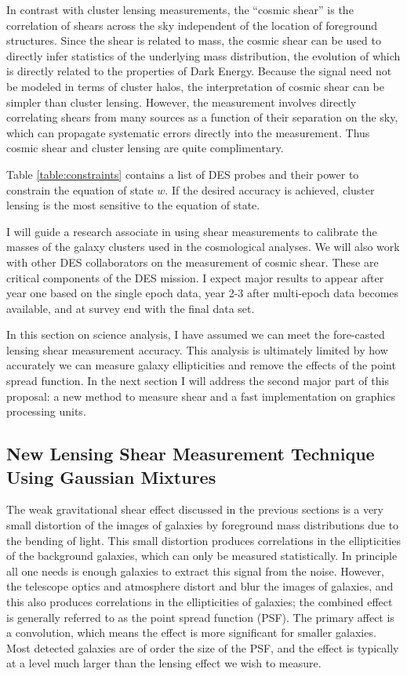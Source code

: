 \documentclass[12pt]{article}
\begin{document}
In contrast with cluster lensing measurements, the ``cosmic shear'' is the
correlation of shears across the sky independent of the location of foreground
structures.  Since the shear is related to mass, the cosmic shear can be used
to directly infer statistics of the underlying mass distribution, the evolution
of which is directly related to the properties of Dark Energy.  Because the
signal need not be modeled in terms of cluster halos, the interpretation of
cosmic shear can be simpler than cluster lensing.  However, the measurement
involves directly correlating shears from many sources as a function of their
separation on the sky, which can propagate systematic errors directly into the
measurement. Thus cosmic shear and cluster lensing are quite complimentary.

Table \ref{table:constraints} contains a list of DES probes and their power to
constrain the equation of state $w$.  If the desired accuracy is achieved,
cluster lensing is the most sensitive to the equation of state.

I will guide a research associate in using shear measurements to calibrate the
masses of the galaxy clusters used in the cosmological analyses.  We will also
work with other DES collaborators on the measurement of cosmic shear.  These
are critical components of the DES mission.   I expect major results to appear
after year one based on the single epoch data, year 2-3 after multi-epoch data
becomes available, and at survey end with the final data set.

In this section on science analysis, I have assumed we can meet the fore-casted
lensing shear measurement accuracy.  This analysis is ultimately limited by how
accurately we can measure galaxy ellipticities and remove the effects of the
point spread function.  In the next section I will address the second major
part of this proposal: a new method to measure shear and a fast implementation
on graphics processing units.

\subsection{New Lensing Shear Measurement Technique Using Gaussian Mixtures}
\label{sec:gmix}

The weak gravitational shear effect discussed in the previous sections is a
very small distortion of the images of galaxies by foreground mass
distributions due to the bending of light.  This small distortion produces
correlations in the ellipticities of the background galaxies, which can only be
measured statistically.  In principle all one needs is enough galaxies to
extract this signal from the noise.  However, the telescope optics and
atmosphere distort and blur the images of galaxies, and this also produces
correlations in the ellipticities of galaxies; the combined effect is generally
referred to as the point spread function (PSF). The primary affect is a
convolution, which means the effect is more significant for smaller galaxies.
Most detected galaxies are of order the size of the PSF, and the effect is
typically at a level much larger than the lensing effect we wish to measure.
\end{document}
